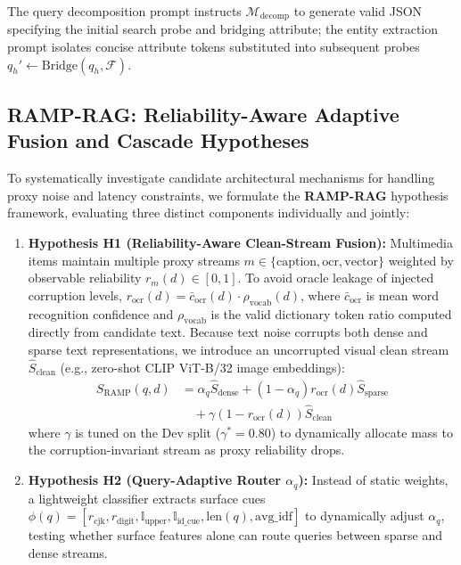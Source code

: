 \documentclass[conference]{IEEEtran}
\begin{document}
The query decomposition prompt instructs $\mathcal{M}_{\text{decomp}}$ to generate valid JSON specifying the initial search probe and bridging attribute; the entity extraction prompt isolates concise attribute tokens substituted into subsequent probes $q_h' \leftarrow \text{Bridge}(q_h, \mathcal{F})$.

\subsection{RAMP-RAG: Reliability-Aware Adaptive Fusion and Cascade Hypotheses}
\label{sec:ramp_rag}
To systematically investigate candidate architectural mechanisms for handling proxy noise and latency constraints, we formulate the \textbf{RAMP-RAG} hypothesis framework, evaluating three distinct components individually and jointly:
\begin{enumerate}
    \setlength{\itemsep}{1pt plus 0.5pt}
    \setlength{\parskip}{0pt}
    \item \textbf{Hypothesis H1 (Reliability-Aware Clean-Stream Fusion):} Multimedia items maintain multiple proxy streams $m \in \{\text{caption}, \text{ocr}, \text{vector}\}$ weighted by observable reliability $r_m(d) \in [0, 1]$. To avoid oracle leakage of injected corruption levels, $r_{\text{ocr}}(d) = \bar{c}_{\text{ocr}}(d) \cdot \rho_{\text{vocab}}(d)$, where $\bar{c}_{\text{ocr}}$ is mean word recognition confidence and $\rho_{\text{vocab}}$ is the valid dictionary token ratio computed directly from candidate text. Because text noise corrupts both dense and sparse text representations, we introduce an uncorrupted visual clean stream $\hat{S}_{\text{clean}}$ (e.g., zero-shot CLIP ViT-B/32 image embeddings):
    \begin{equation}
    \begin{aligned}
        S_{\text{RAMP}}(q, d) &= \alpha_q \hat{S}_{\text{dense}} + (1 - \alpha_q) r_{\text{ocr}}(d) \hat{S}_{\text{sparse}} \\
        &\quad + \gamma (1 - r_{\text{ocr}}(d)) \hat{S}_{\text{clean}}
    \end{aligned}
    \label{eq:ramp}
    \end{equation}
    where $\gamma$ is tuned on the Dev split ($\gamma^* = 0.80$) to dynamically allocate mass to the corruption-invariant stream as proxy reliability drops.
    \item \textbf{Hypothesis H2 (Query-Adaptive Router $\alpha_q$):} Instead of static weights, a lightweight classifier extracts surface cues $\phi(q) = [r_{\text{cjk}}, r_{\text{digit}}, \mathbb{I}_{\text{upper}}, \mathbb{I}_{\text{id\_cue}}, \text{len}(q), \text{avg\_idf}]$ to dynamically adjust $\alpha_q$, testing whether surface features alone can route queries between sparse and dense streams.

\end{enumerate}
\end{document}
